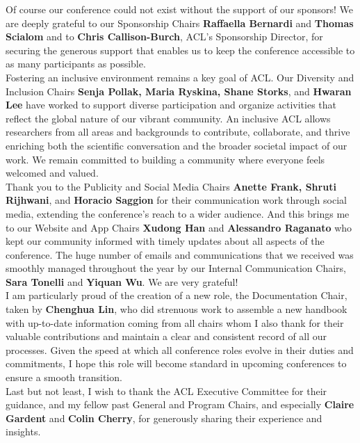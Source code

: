 Of course our conference could not exist without the support of our sponsors! We are deeply grateful to our Sponsorship Chairs \textemdash \textbf{Raffaella Bernardi} and \textbf{Thomas Scialom} \textemdash and to \textbf{Chris Callison-Burch}, ACL’s Sponsorship Director, for securing the generous support that enables us to keep the conference accessible to as many participants as possible.\\


Fostering an inclusive environment remains a key goal of ACL. Our Diversity and Inclusion Chairs \textemdash \textbf{Senja Pollak, Maria Ryskina, Shane Storks}, and \textbf{Hwaran Lee} \textemdash have worked to support diverse participation and organize activities that reflect the global nature of our vibrant community. An inclusive ACL allows researchers from all areas and backgrounds to contribute, collaborate, and thrive \textemdash enriching both the scientific conversation and the broader societal impact of our work. We remain committed to building a community where everyone feels welcomed and valued.\\


Thank you to the Publicity and Social Media Chairs \textemdash \textbf{Anette Frank, Shruti Rijhwani}, and \textbf{Horacio Saggion} \textemdash for their communication work through social media, extending the conference’s reach to a wider audience. And this brings me to our Website and App Chairs \textemdash \textbf{Xudong Han} and \textbf{Alessandro Raganato} \textemdash who kept our community informed with timely updates about all aspects of the conference. The huge number of emails and communications that we received was smoothly managed throughout the year by our Internal Communication Chairs, \textbf{Sara Tonelli} and \textbf{Yiquan Wu}. We are very grateful!\\


I am particularly proud of the creation of a new role, the Documentation Chair, taken by \textbf{Chenghua Lin}, who did strenuous work to assemble a new handbook with up-to-date information coming from all chairs \textemdash whom I also thank for their valuable contributions \textemdash and maintain a clear and consistent record of all our processes. Given the speed at which all conference roles evolve in their duties and commitments, I hope this role will become standard in upcoming conferences to ensure a smooth transition.\\


Last but not least, I wish to thank the ACL Executive Committee for their guidance, and my fellow past General and Program Chairs, and especially \textbf{Claire Gardent} and \textbf{Colin Cherry}, for generously sharing their experience and insights.\\


